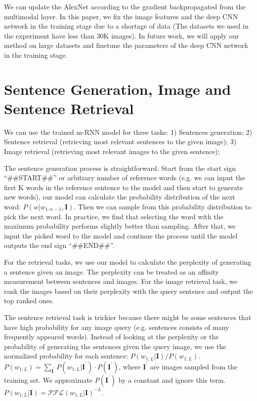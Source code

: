 We can update the AlexNet according to the gradient backpropagated from the multimodal layer. In this paper, we fix the image features and the deep CNN network in the training stage due to a shortage of data (The datasets we used in the experiment have less than 30K images).
In future work, we will apply our method on large datasets and finetune the parameters of the deep CNN network in the training stage.

\section{Sentence Generation, Image and Sentence Retrieval}
We can use the trained m-RNN model for three tasks: 1) Sentences generation; 2) Sentence retrieval (retrieving most relevant sentences to the given image); 3) Image retrieval (retrieving most relevant images to the given sentence);

The sentence generation process is straightforward.
Start from the start sign ``\#\#START\#\#'' or arbitrary number of reference words (e.g. we can input the first K words in the reference sentence to the model and then start to generate new words), our model can calculate the probability distribution of the next word: $P(w|w_{1:n-1},\mathbf{I})$.
Then we can sample from this probability distribution to pick the next word.
In practice, we find that selecting the word with the maximum probability performs slightly better than sampling.
After that, we input the picked word to the model and continue the process until the model outputs the end sign ``\#\#END\#\#''.

For the retrieval tasks, we use our model to calculate the perplexity of generating a sentence given an image.
The perplexity can be treated as an affinity measurement between sentences and images.
For the image retrieval task, we rank the images based on their perplexity with the query sentence and output the top ranked ones. 

The sentence retrieval task is trickier because there might be some sentences that have high probability for any image query (e.g. sentences consists of many frequently appeared words).
Instead of looking at the perplexity or the probability of generating the sentences given the query image, we use the normalized probability for each sentence: $P(w_{1:L}|\mathbf{I}) / P(w_{1:L})$.
$P(w_{1:L}) = \sum_{\mathbf{I^{'}}} P(w_{1:L}|\mathbf{I^{'}}) \cdot P(\mathbf{I^{'}})$, where $\mathbf{I^{'}}$ are images sampled from the training set.
We approximate $P(\mathbf{I^{'}})$ by a constant and ignore this term.
$P(w_{1:L}|\mathbf{I}) = \mathcal{PPL}(w_{1:L}|\mathbf{I}) ^ {-L}$.
